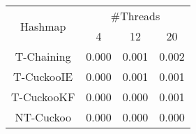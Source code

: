\begin{tabular}{|c|c|c|c|}
\hline
\multirow{2}{*}{Hashmap} & \multicolumn{3}{c|}{\#Threads}\\\cline{2-4}& 4 & 12 & 20\\
\hline
\hline
T-Chaining & 0.000 & 0.001 & 0.002\\
T-CuckooIE & 0.000 & 0.001 & 0.001\\
T-CuckooKF & 0.000 & 0.000 & 0.001\\
NT-Cuckoo & 0.000 & 0.000 & 0.000\\
\hline
\end{tabular}
